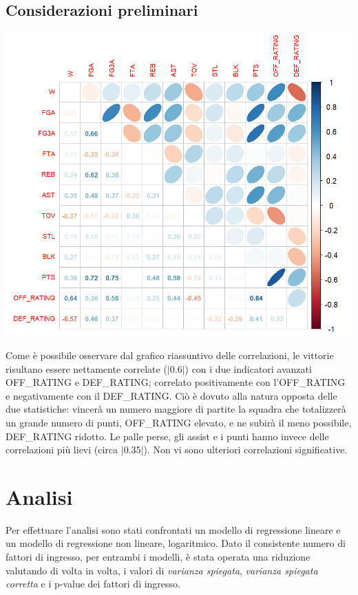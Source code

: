 \documentclass[11pt,a4paper]{article}
\begin{document}
\subsection{Considerazioni preliminari}
\begin{minipage}{0.5\textwidth} 
    \hspace{-1.30cm}
    \includegraphics[scale=.52]{imgs/correlation_plot.png}
\end{minipage}
\begin{minipage}{0.5\textwidth} 
    Come è possibile osservare dal grafico riassuntivo delle correlazioni, le vittorie risultano essere nettamente correlate ($|0.6|$) con i due indicatori avanzati OFF\_RATING e DEF\_RATING; correlato positivamente con l'OFF\_RATING e negativamente con il DEF\_RATING. Ciò è dovuto alla natura opposta delle due statistiche: vincerà un numero maggiore di partite la squadra che totalizzerà un grande numero di punti, OFF\_RATING elevato, e ne subirà il meno possibile, DEF\_RATING ridotto.
    Le palle perse, gli assist e i punti hanno invece delle correlazioni più lievi (circa $|0.35|$). Non vi sono ulteriori correlazioni significative.
\end{minipage}

\section{Analisi}
Per effettuare l'analisi sono stati confrontati un modello di regressione lineare e un modello di regressione non lineare, logaritmico. Dato il consistente numero di fattori di ingresso, per entrambi i modelli, è stata operata una riduzione valutando di volta in volta, i valori di \emph{varianza spiegata}, \emph{varianza spiegata corretta} e i p-value dei fattori di ingresso. 
\end{document}
